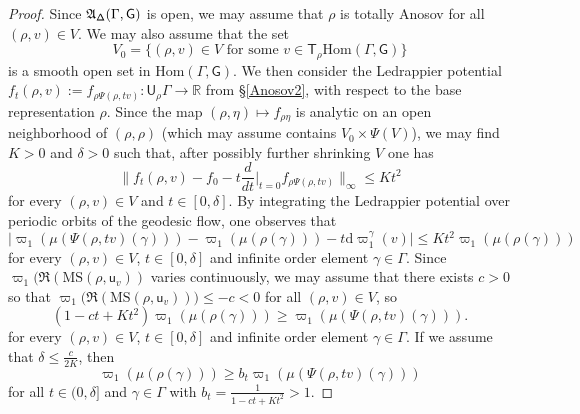 \documentclass{amsart}
\theoremstyle{plain}
\theoremstyle{definition}
\theoremstyle{remark}
\newcommand{\R}{\mathbb R}
\renewcommand{\sf}[1]{{\mathsf{#1}}}
\newcommand{\<}{\left <}
\renewcommand{\>}{\right >}
\newcommand{\G}{\Gamma}
\newcommand{\g}{\gamma}
\newcommand{\M}{\mathrm{MS}}
\newcommand{\co}{\sf u}
\newcommand{\dd}{{\mathrm{d}}}
\begin{document}
\begin{proof} 
Since $\frak A_{\sf \Delta}(\G,\sf G)$ is open, we may assume that $\rho$ is totally Anosov for all $(\rho,v)\in V$.
We may also assume that the set 
$$V_0=\{(\rho,v)\in V\text{ for some }v\in \sf T_\rho\mathrm{Hom}(\Gamma,\sf G)\}$$
is a smooth open set in $\mathrm{Hom}(\Gamma,\sf G)$.
We then consider the Ledrappier potential $f_t(\rho,v):=f_{\rho \Psi(\rho,tv)}:\sf U_\rho\G\to\R$ from \S\ref{Anosov2},
with respect to the base representation $\rho.$ 
Since the map $(\rho,\eta)\mapsto f_{\rho\eta}$ is analytic  on an open neighborhood of $(\rho,\rho)$
(which may assume contains $V_0\times \Psi(V)$),
we may find $K>0$ and $\delta>0$ such that, after possibly further shrinking $V$
one has 
$$\|f_t(\rho,v)-f_0-t\frac{d}{dt}\Big|_{t=0}f_{\rho\Psi(\rho,tv)}\|_\infty\leq K t^2$$
for every $(\rho,v)\in V$ and $t\in [0,\delta]$. 
By integrating the Ledrappier potential over periodic orbits
of the geodesic flow,
one observes  that
$$\big|\varpi_1(\mu(\Psi(\rho,tv)(\g)))-\varpi_1(\mu(\rho(\g)))-t\dd\varpi_1^\g(v)\big|\leq Kt^2\varpi_1(\mu(\rho(\g)))$$  
for every $(\rho,v)\in V$,  $t\in [0,\delta]$ and infinite order element $\g\in\G$. 
Since $\varpi_1\big(\Re(\M(\rho,\co_v))$ varies continuously, we may assume
that there exists $c>0$ so that $\varpi_1\big(\Re(\M(\rho,\co_v))\big)\leq-c<0$ for all $(\rho,v)\in V$, so 
$$(1-ct+K t^2)\varpi_1(\mu(\rho(\g)))\geq\varpi_1(\mu(\Psi(\rho,tv)(\g))).$$
for every $(\rho,v)\in V$,  $t\in [0,\delta]$ and infinite order element $\g\in\G$. 
If we assume that $\delta\le\frac{c}{2K}$, then
$$\varpi_1(\mu(\rho(\g)))\geq b_t\varpi_1(\mu(\Psi(\rho,tv)(\g)))$$ 
for all $t\in (0,\delta]$ and $\g\in\G$
with $b_t=\frac{1}{1-ct+K t^2}> 1.$





\end{proof}
\end{document}
